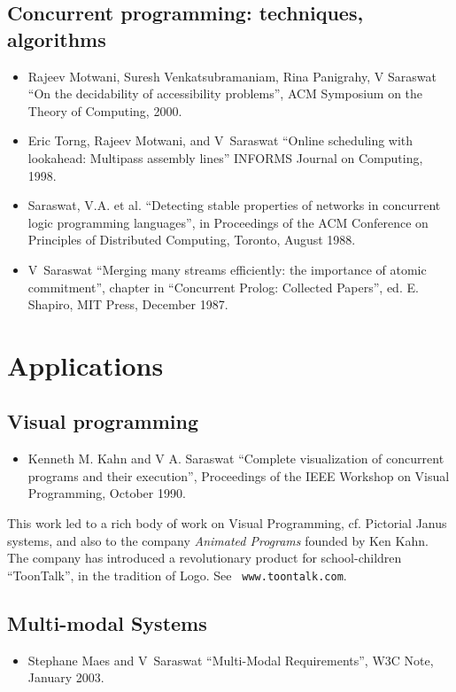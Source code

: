 \documentclass{article}
\begin{document}
\subsection*{Concurrent programming: techniques, algorithms}
\begin{itemize} 

\item   Rajeev Motwani, Suresh Venkatsubramaniam, Rina Panigrahy, V
   Saraswat ``On the decidability of accessibility problems'', ACM
   Symposium on the Theory of Computing, 2000.

\item   Eric Torng, Rajeev Motwani, and V~Saraswat ``Online
   scheduling with lookahead: Multipass assembly lines''
   INFORMS Journal on Computing, 1998.

\item   Saraswat, V.A. et al. ``Detecting stable properties
   of networks in concurrent logic programming languages'', in
   Proceedings of the ACM Conference on Principles of
   Distributed Computing, Toronto, August 1988.
  
\item   V~Saraswat ``Merging many streams efficiently: the
   importance of atomic commitment'', chapter in ``Concurrent
   Prolog: Collected Papers'', ed. E. Shapiro, MIT Press, December
   1987.
\end{itemize}

\section*{Applications}
\subsection*{Visual programming}
\begin{itemize} 
\item    Kenneth M. Kahn and V A. Saraswat ``Complete
    visualization of concurrent programs and their execution'',
    Proceedings of the IEEE Workshop on Visual Programming, October
    1990. 
\end{itemize} 

This work led to a rich body of work on Visual Programming, cf.{}
Pictorial Janus systems, and also to the company \textit{ Animated
Programs} founded by Ken Kahn. The company has introduced a
revolutionary product for school-children ``ToonTalk'', in the
tradition of Logo. See \texttt{ www.toontalk.com}.

\subsection*{Multi-modal Systems}
\begin{itemize}
\item Stephane Maes and V~Saraswat ``Multi-Modal Requirements'', 
W3C Note, January 2003.
\end{itemize}				   
\end{document}
